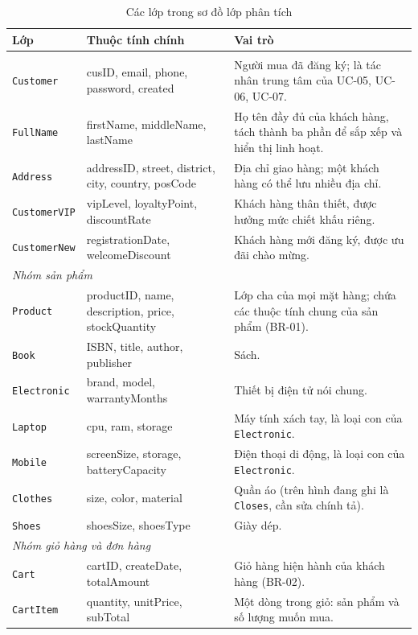 \documentclass[12pt,a4paper,oneside]{report}
\begin{document}
\begin{longtable}{p{2.9cm}p{4.4cm}p{8.5cm}}
\caption{Các lớp trong sơ đồ lớp phân tích}\\
\toprule
\textbf{Lớp} & \textbf{Thuộc tính chính} & \textbf{Vai trò} \\
\midrule
\endhead
\bottomrule
\endlastfoot
\multicolumn{3}{l}{\textit{Nhóm khách hàng}} \\
\texttt{Customer} & cusID, email, phone, password, created & Người mua đã đăng ký; là tác nhân trung tâm của UC-05, UC-06, UC-07. \\
\texttt{FullName} & firstName, middleName, lastName & Họ tên đầy đủ của khách hàng, tách thành ba phần để sắp xếp và hiển thị linh hoạt. \\
\texttt{Address} & addressID, street, district, city, country, posCode & Địa chỉ giao hàng; một khách hàng có thể lưu nhiều địa chỉ. \\
\texttt{CustomerVIP} & vipLevel, loyaltyPoint, discountRate & Khách hàng thân thiết, được hưởng mức chiết khấu riêng. \\
\texttt{CustomerNew} & registrationDate, welcomeDiscount & Khách hàng mới đăng ký, được ưu đãi chào mừng. \\
\multicolumn{3}{l}{\textit{Nhóm sản phẩm}} \\
\texttt{Product} & productID, name, description, price, stockQuantity & Lớp cha của mọi mặt hàng; chứa các thuộc tính chung của sản phẩm (BR-01). \\
\texttt{Book} & ISBN, title, author, publisher & Sách. \\
\texttt{Electronic} & brand, model, warrantyMonths & Thiết bị điện tử nói chung. \\
\texttt{Laptop} & cpu, ram, storage & Máy tính xách tay, là loại con của \texttt{Electronic}. \\
\texttt{Mobile} & screenSize, storage, batteryCapacity & Điện thoại di động, là loại con của \texttt{Electronic}. \\
\texttt{Clothes} & size, color, material & Quần áo (trên hình đang ghi là \texttt{Closes}, cần sửa chính tả). \\
\texttt{Shoes} & shoesSize, shoesType & Giày dép. \\
\multicolumn{3}{l}{\textit{Nhóm giỏ hàng và đơn hàng}} \\
\texttt{Cart} & cartID, createDate, totalAmount & Giỏ hàng hiện hành của khách hàng (BR-02). \\
\texttt{CartItem} & quantity, unitPrice, subTotal & Một dòng trong giỏ: sản phẩm và số lượng muốn mua. \\

\end{longtable}
\end{document}
